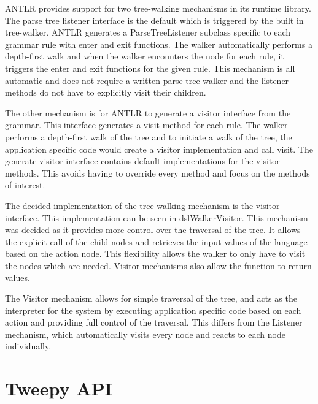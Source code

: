 ANTLR provides support for two tree-walking mechanisms in its runtime library. The parse tree listener interface is the default which is triggered by the built in tree-walker. ANTLR generates a ParseTreeListener subclass specific to each grammar rule with enter and exit functions. The walker automatically performs a depth-first walk and when the walker encounters the node for each rule, it triggers the enter and exit functions for the given rule. This mechanism is all automatic and does not require a written parse-tree walker and the listener methods do not have to explicitly visit their children. \newline \par

The other mechanism is for ANTLR to generate a visitor interface from the grammar. This interface generates a visit method for each rule. The walker performs a depth-first walk of the tree and to initiate a walk of the tree, the application specific code would create a visitor implementation and call visit. The generate visitor interface contains default implementations for the visitor methods. This avoids having to override every method and focus on the methods of interest. \newline \par

The decided implementation of the tree-walking mechanism is the visitor interface. This implementation can be seen in dslWalkerVisitor. This mechanism was decided as it provides more control over the traversal of the tree. It allows the explicit call of the child nodes and retrieves the input values of the language based on the action node. This flexibility allows the walker to only have to visit the nodes which are needed. Visitor mechanisms also allow the function to return values. \newline \par

The Visitor mechanism allows for simple traversal of the tree, and acts as the interpreter for the system by executing application specific code based on each action and providing full control of the traversal. This differs from the Listener mechanism, which automatically visits every node and reacts to each node individually.

\section{Tweepy API}

